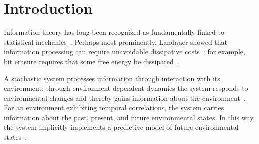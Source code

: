 \documentclass[entropy,article,
submit,
moreauthors,pdftex,10pt,a4paper]{mdpi}
\begin{document}




\section{Introduction}

Information theory has long been recognized as fundamentally linked to statistical mechanics~\cite{Jaynes:1957ua}. Perhaps most prominently, Landauer showed that information processing can require unavoidable dissipative costs~\cite{landauer1961irreversibility}; for example, bit erasure requires that some free energy be dissipated~\cite{Berut2012,Jun2014}. 

A stochastic system processes information through interaction with its environment: 
through environment-dependent dynamics the system responds to environmental changes and thereby gains information about the environment~\cite{Cheong:2011jp,Mehta:2012ji}.
For an 
environment exhibiting temporal correlations, the system carries information about the past, present, and future environmental states.
In this way, the system implicitly implements a predictive model of future environmental states~\cite{Still2012}.
\end{document}
